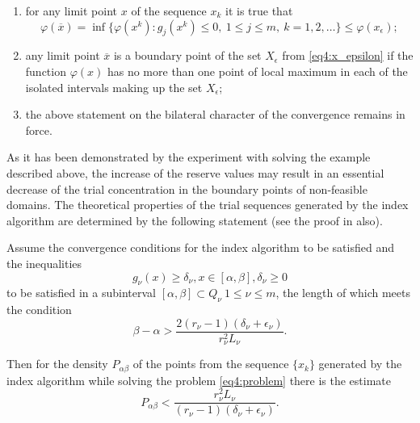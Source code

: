 \begin{theorem}
\begin{enumerate}
    \item for any limit point $x$ of the sequence ${x_k}$ it is true that
    \begin{displaymath}
      \varphi(\overline x)=\inf\{\varphi(x^k):g_j(x^k)\le 0,\: 1\le j\le m,\: k=1,2,\dots\}\le\varphi(x_\epsilon);
    \end{displaymath}
    \item any limit point $\overline x$ is a boundary point of the set $X_\epsilon$ from \eqref{eq4:x_epsilon} if the function $\varphi(x)$ has no more than one point of local maximum in each of the isolated intervals making up the set $X_\epsilon$;
    \item the above statement on the bilateral character of the convergence remains in force.
  \end{enumerate}
\end{theorem}

As it has been demonstrated by the experiment with solving the example described above, the increase of the reserve values may result in an essential decrease of the trial concentration in the boundary points of non-feasible domains. The theoretical properties of the trial sequences generated by the index algorithm are determined by the following statement (see the proof in \cite{stronginSergeyev2000} also).
\begin{theorem}
  Assume the convergence conditions for the index algorithm to be satisfied and the inequalities
  \begin{displaymath}
    g_\nu(x)\ge\delta_\nu,x\in[\alpha,\beta],\delta_\nu\ge 0
  \end{displaymath}
  to be satisfied in a subinterval $[\alpha,\beta]\subset Q_\nu \: 1\le\nu\le m$, the length of which meets the condition
  \begin{displaymath}
    \beta-\alpha>\frac{2(r_\nu-1)(\delta_\nu+\epsilon_\nu)}{r^2_\nu L_\nu}.
  \end{displaymath}

  Then for the density $P_{\alpha\beta}$ of the points from the sequence $\{x_k\}$ generated by the index algorithm while solving the problem \eqref{eq4:problem} there is the estimate
  \begin{displaymath}
    P_{\alpha\beta}<\frac{r^2_\nu L_\nu}{(r_\nu-1)(\delta_\nu+\epsilon_\nu)}.
  \end{displaymath}
\end{theorem}

